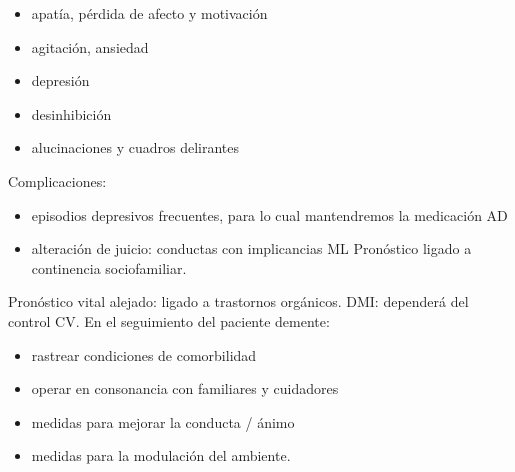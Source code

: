 \begin{itemize}
	\item apatía, pérdida de afecto y motivación
	\item agitación, ansiedad
	\item depresión
	\item desinhibición
	\item alucinaciones y cuadros delirantes 
\end{itemize}

Complicaciones: 
\begin{itemize}
	\item episodios depresivos frecuentes, para lo cual mantendremos la medicación AD 
	\item alteración de juicio: conductas con implicancias ML Pronóstico ligado a continencia sociofamiliar. 
\end{itemize}

Pronóstico vital alejado: ligado a trastornos orgánicos. DMI: dependerá del control CV. En el seguimiento del paciente demente:
 
\begin{itemize}
	\item rastrear condiciones de comorbilidad 
	\item operar en consonancia con familiares y cuidadores 
	\item medidas para mejorar la conducta / ánimo 
	\item medidas para la modulación del ambiente.
\end{itemize}
\printbibliography

